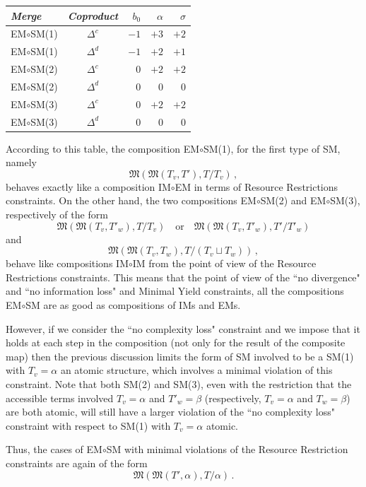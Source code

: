 \documentclass[12pt]{amsart}
\numberwithin{equation}{section}
\def\fM{{\mathfrak M}}
\begin{document}
\begin{center}
\begin{tabular}{| l  | c ||r|r|r|}
\hline
{\em Merge}  & {\em Coproduct} & $b_0$ & $\alpha$ & $\sigma$  \\
\hline
EM$\circ$SM(1) &  $\Delta^c$ & $ -1 $  &  $  +3$  &   $ +2 $      \\
\hline
EM$\circ$SM(1) & $\Delta^d$ &  $ -1 $ & $ +2 $  & $ +1 $  \\
\hline
EM$\circ$SM(2)  & $\Delta^c$ & $ 0 $  & $ +2 $  &  $ +2  $     \\
\hline
EM$\circ$SM(2)  &  $\Delta^d$ &  $ 0 $ & $ 0 $  & $ 0 $    \\
\hline
EM$\circ$SM(3)  & $\Delta^c$ & $ 0 $   & $ +2 $  & $ +2 $    \\
\hline
EM$\circ$SM(3)  & $\Delta^d$ & $ 0 $  & $ 0 $  & $ 0 $     \\
\hline
\end{tabular}
\end{center}
According to this table, the composition EM$\circ$SM(1),
for the first type of SM, namely
$$ \fM(\fM(T_v,T'),T/T_v)\, , $$
behaves exactly like a composition IM$\circ$EM in terms of
Resource Restrictions constraints. On the other hand, the
two compositions EM$\circ$SM(2) and EM$\circ$SM(3),
respectively of the form
$$ \fM(\fM(T_v,T'_w),T/T_v)  \ \ \ \text{ or } \ \ \  \fM(\fM(T_v,T'_w),T'/T'_w)  $$
and
$$ \fM(\fM(T_v,T_w),T/(T_v \sqcup T_w))\, , $$
behave like compositions IM$\circ$IM from the point of view of
the Resource Restrictions constraints. This means that the
point of view of the ``no divergence" and ``no information loss"
and Minimal Yield constraints, all the compositions EM$\circ$SM
are as good as compositions of IMs and EMs.  

However, if we consider the ``no complexity loss"
constraint and we impose that it holds at each step
in the composition (not only for the result of the
composite map) then the previous discussion limits
the form of SM involved to be a SM(1) with $T_v=\alpha$
an atomic structure, which involves a minimal
violation of this constraint. Note that both SM(2) and
SM(3), even with the restriction that the accessible
terms involved $T_v=\alpha$
and $T'_w=\beta$ (respectively, $T_v=\alpha$
and $T_w=\beta$) are both atomic, will still have
a larger violation of the ``no complexity loss" constraint
with respect to SM(1) with $T_v=\alpha$ atomic.

Thus, the cases of  EM$\circ$SM with minimal
violations of the Resource Restriction constraints
are again of the form 
$$ \fM( \fM(T', \alpha), T/\alpha ) \, .  $$
\end{document}
